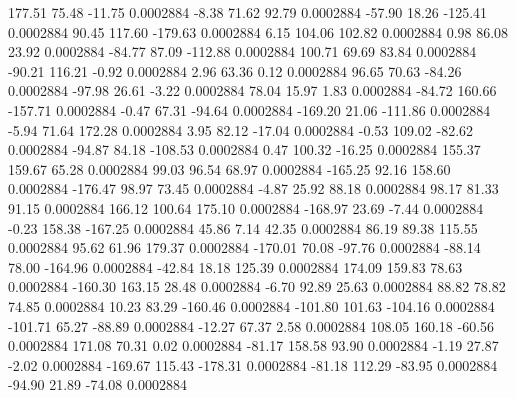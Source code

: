       177.51       75.48      -11.75     0.0002884
       -8.38       71.62       92.79     0.0002884
      -57.90       18.26     -125.41     0.0002884
       90.45      117.60     -179.63     0.0002884
        6.15      104.06      102.82     0.0002884
        0.98       86.08       23.92     0.0002884
      -84.77       87.09     -112.88     0.0002884
      100.71       69.69       83.84     0.0002884
      -90.21      116.21       -0.92     0.0002884
        2.96       63.36        0.12     0.0002884
       96.65       70.63      -84.26     0.0002884
      -97.98       26.61       -3.22     0.0002884
       78.04       15.97        1.83     0.0002884
      -84.72      160.66     -157.71     0.0002884
       -0.47       67.31      -94.64     0.0002884
     -169.20       21.06     -111.86     0.0002884
       -5.94       71.64      172.28     0.0002884
        3.95       82.12      -17.04     0.0002884
       -0.53      109.02      -82.62     0.0002884
      -94.87       84.18     -108.53     0.0002884
        0.47      100.32      -16.25     0.0002884
      155.37      159.67       65.28     0.0002884
       99.03       96.54       68.97     0.0002884
     -165.25       92.16      158.60     0.0002884
     -176.47       98.97       73.45     0.0002884
       -4.87       25.92       88.18     0.0002884
       98.17       81.33       91.15     0.0002884
      166.12      100.64      175.10     0.0002884
     -168.97       23.69       -7.44     0.0002884
       -0.23      158.38     -167.25     0.0002884
       45.86        7.14       42.35     0.0002884
       86.19       89.38      115.55     0.0002884
       95.62       61.96      179.37     0.0002884
     -170.01       70.08      -97.76     0.0002884
      -88.14       78.00     -164.96     0.0002884
      -42.84       18.18      125.39     0.0002884
      174.09      159.83       78.63     0.0002884
     -160.30      163.15       28.48     0.0002884
       -6.70       92.89       25.63     0.0002884
       88.82       78.82       74.85     0.0002884
       10.23       83.29     -160.46     0.0002884
     -101.80      101.63     -104.16     0.0002884
     -101.71       65.27      -88.89     0.0002884
      -12.27       67.37        2.58     0.0002884
      108.05      160.18      -60.56     0.0002884
      171.08       70.31        0.02     0.0002884
      -81.17      158.58       93.90     0.0002884
       -1.19       27.87       -2.02     0.0002884
     -169.67      115.43     -178.31     0.0002884
      -81.18      112.29      -83.95     0.0002884
      -94.90       21.89      -74.08     0.0002884

